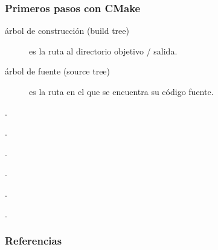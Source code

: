 \begin{frame}
	\frametitle{Primeros pasos con CMake}
	
	\begin{description}
		\item[árbol de construcción (build tree)]

		es la ruta al directorio objetivo / salida.

		\item[árbol de fuente (source tree)]

		es la ruta en el que se encuentra su código fuente.
	\end{description}
\end{frame}

\begin{frame}
	.
\end{frame}

\begin{frame}
	.
\end{frame}

\begin{frame}
	.
\end{frame}

\begin{frame}
	.
\end{frame}

\begin{frame}
	.
\end{frame}

\begin{frame}
	.
\end{frame}

\begin{frame}\transblindsvertical
	\frametitle{Referencias}
\end{frame}


